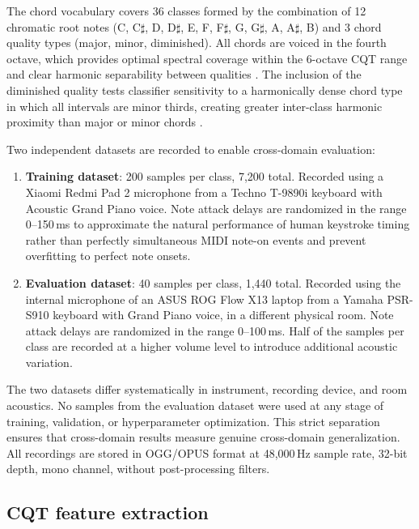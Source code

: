 \documentclass[pdflatex,sn-mathphys-num,iicol]{sn-jnl}
\theoremstyle{thmstyleone}
\theoremstyle{thmstyletwo}
\theoremstyle{thmstylethree}
\begin{document}
The chord vocabulary covers 36 classes formed by the combination of 12 chromatic root notes (C, C$\sharp$, D, D$\sharp$, E, F, F$\sharp$, G, G$\sharp$, A, A$\sharp$, B) and 3 chord quality types (major, minor, diminished). All chords are voiced in the fourth octave, which provides optimal spectral coverage within the 6-octave CQT range and clear harmonic separability between qualities \cite{Telila2023} \cite{Harte2010}. The inclusion of the diminished quality tests classifier sensitivity to a harmonically dense chord type in which all intervals are minor thirds, creating greater inter-class harmonic proximity than major or minor chords \cite{Byambatsogt2020}.

Two independent datasets are recorded to enable cross-domain evaluation:

\begin{enumerate}[1.]

\item \textbf{Training dataset}: 200 samples per class, 7,200 total. Recorded using a Xiaomi Redmi Pad 2 microphone from a Techno T-9890i keyboard with Acoustic Grand Piano voice. Note attack delays are randomized in the range 0--150\,ms to approximate the natural performance of human keystroke timing rather than perfectly simultaneous MIDI note-on events \cite{Bella2011} and prevent overfitting to perfect note onsets.

\item \textbf{Evaluation dataset}: 40 samples per class, 1,440 total. Recorded using the internal microphone of an ASUS ROG Flow X13 laptop from a Yamaha PSR-S910 keyboard with Grand Piano voice, in a different physical room. Note attack delays are randomized in the range 0--100\,ms. Half of the samples per class are recorded at a higher volume level to introduce additional acoustic variation.

\end{enumerate}

The two datasets differ systematically in instrument, recording device, and room acoustics. No samples from the evaluation dataset were used at any stage of training, validation, or hyperparameter optimization. This strict separation ensures that cross-domain results measure genuine cross-domain generalization. All recordings are stored in OGG/OPUS format at 48,000\,Hz sample rate, 32-bit depth, mono channel, without post-processing filters.

\subsection{CQT feature extraction}\label{subsec3_2}
\end{document}
